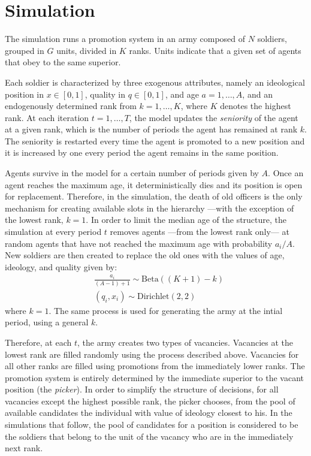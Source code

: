 \section{Simulation}
\label{sec:simulation}

The simulation runs a promotion system in an army composed of $N$ soldiers,
grouped in $G$ units, divided in $K$ ranks. Units indicate that a given set of
agents that obey to the same superior.

Each soldier is characterized by three exogenous attributes, namely an
ideological position in $x\in[0, 1]$, quality in $q\in[0, 1]$, and age
$a=1, \dots, A$, and an endogenously determined rank from $k=1, \dots, K$, where
$K$ denotes the highest rank. At each iteration $t =1, \dots, T$, the model
updates the \emph{seniority} of the agent at a given rank, which is the number
of periods the agent has remained at rank $k$. The seniority is restarted every
time the agent is promoted to a new position and it is increased by one every
period the agent remains in the same position.

Agents survive in the model for a certain number of periods given by $A$. Once
an agent reaches the maximum age, it deterministically dies and its position is
open for replacement. Therefore, in the simulation, the death of old officers is
the only mechanism for creating available slots in the hierarchy ---with the
exception of the lowest rank, $k=1$. In order to limit the median age of the
structure, the simulation at every period $t$ removes agents ---from the lowest
rank only--- at random agents that have not reached the maximum age with
probability $a_i/A$. New soldiers are then created to replace the old ones with
the values of age, ideology, and quality given by:
\begin{eqnarray}
  & \frac{a_i}{(A - 1) + 1}  \sim \text{Beta}((K + 1) - k) \\
  & (q_i, x_i) \sim \text{Dirichlet}(2, 2) 
\end{eqnarray}
where $k=1$. The same process is used for generating the army at the intial
period, using a general $k$.

Therefore, at each $t$, the army creates two types of vacancies. Vacancies at
the lowest rank are filled randomly using the process described above. Vacancies
for all other ranks are filled using promotions from the immediately lower
ranks. The promotion system is entirely determined by the immediate superior to
the vacant position (the \emph{picker}). In order to simplify the structure of
decisions, for all vacancies except the highest possible rank, the picker
chooses, from the pool of available candidates the individual with value of
ideology closest to his. In the simulations that follow, the pool of candidates
for a position is considered to be the soldiers that belong to the unit of the
vacancy who are in the immediately next rank.

